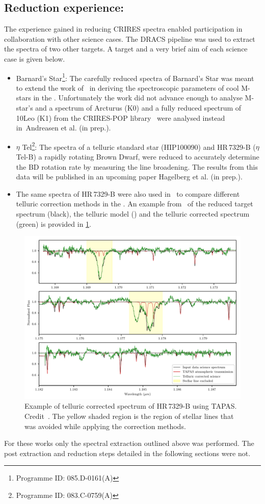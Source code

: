 \subsection{Reduction experience:}
\label{subsec:experience}
The experience gained in reducing {CRIRES} spectra enabled participation in collaboration with other science cases.
The {DRACS} pipeline was used to extract the spectra of two other targets.
A target and a very brief aim of each science case is given below.
\begin{itemize}
\item Barnard's Star\footnote{Programme {{ID}}: 085.D-0161(A)}: The carefully reduced \nir{} spectra of Barnard's Star was meant to extend the work of~\citet{andreasen_nearinfrared_2016} in deriving the spectroscopic parameters of cool M-stars in the \nir{}.
Unfortunately the work did not advance enough to analyse M-star's and a spectrum of {Arcturus} (K0) and a fully reduced spectrum of {10Leo} (K1) from the {CRIRES}-POP library~\cite{nicholls_crirespop_2017} were analysed instead in~{Andreasen et al. (in prep.)}.
\item \(\eta\) Tel\footnote{Programme {{ID}}: 083.C-0759(A)}: The spectra of a telluric standard star (HIP100090) and {HR\,7329-B} (\(\eta\) Tel-B) a rapidly rotating Brown Dwarf, were reduced to accurately determine the BD rotation rate by measuring the line broadening.
The results from this data will be published in an upcoming paper {Hagelberg et al. (in prep.)}.
\item The same spectra of {HR\,7329-B} were also used in~\citet{ulmer-moll_telluric_2018} to compare different telluric correction methods in the \nir{}.
An example from~\citet[][(B.3)]{ulmer-moll_telluric_2018} of the reduced target spectrum (black), the telluric model () and the telluric corrected spectrum (green) is provided in \cref{fig:ulmermol2018tellcorrcrires48}.
\end{itemize}

\begin{figure}
    \centering
    \includegraphics[width=0.7\linewidth]{figures/reduction/ulmermol2018_tell_corr_CRIRES_48}
    \caption{Example of telluric corrected spectrum of {HR\,7329-B} using {TAPAS}.
Credit~\citet[][]{ulmer-moll_telluric_2018}.
The yellow shaded region is the region of stellar lines that was avoided while applying the correction methods.}
    \label{fig:ulmermol2018tellcorrcrires48}
\end{figure}

For these works only the spectral extraction outlined above was performed.
The post extraction and reduction steps detailed in the following sections were not.



